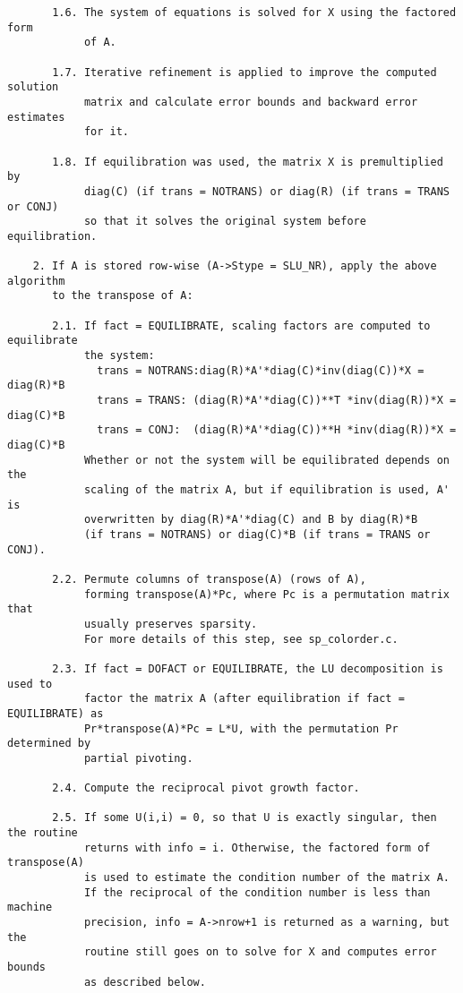 \begin{verbatim}
       1.6. The system of equations is solved for X using the factored form
            of A.

       1.7. Iterative refinement is applied to improve the computed solution
            matrix and calculate error bounds and backward error estimates
            for it.

       1.8. If equilibration was used, the matrix X is premultiplied by
            diag(C) (if trans = NOTRANS) or diag(R) (if trans = TRANS or CONJ)
            so that it solves the original system before equilibration.

    2. If A is stored row-wise (A->Stype = SLU_NR), apply the above algorithm
       to the transpose of A:

       2.1. If fact = EQUILIBRATE, scaling factors are computed to equilibrate
            the system:
              trans = NOTRANS:diag(R)*A'*diag(C)*inv(diag(C))*X = diag(R)*B
              trans = TRANS: (diag(R)*A'*diag(C))**T *inv(diag(R))*X = diag(C)*B
              trans = CONJ:  (diag(R)*A'*diag(C))**H *inv(diag(R))*X = diag(C)*B
            Whether or not the system will be equilibrated depends on the
            scaling of the matrix A, but if equilibration is used, A' is
            overwritten by diag(R)*A'*diag(C) and B by diag(R)*B 
            (if trans = NOTRANS) or diag(C)*B (if trans = TRANS or CONJ).

       2.2. Permute columns of transpose(A) (rows of A), 
            forming transpose(A)*Pc, where Pc is a permutation matrix that
            usually preserves sparsity.
            For more details of this step, see sp_colorder.c.

       2.3. If fact = DOFACT or EQUILIBRATE, the LU decomposition is used to 
            factor the matrix A (after equilibration if fact = EQUILIBRATE) as
            Pr*transpose(A)*Pc = L*U, with the permutation Pr determined by
            partial pivoting.

       2.4. Compute the reciprocal pivot growth factor.

       2.5. If some U(i,i) = 0, so that U is exactly singular, then the routine
            returns with info = i. Otherwise, the factored form of transpose(A)
            is used to estimate the condition number of the matrix A.
            If the reciprocal of the condition number is less than machine
            precision, info = A->nrow+1 is returned as a warning, but the
            routine still goes on to solve for X and computes error bounds
            as described below.


\end{verbatim}
